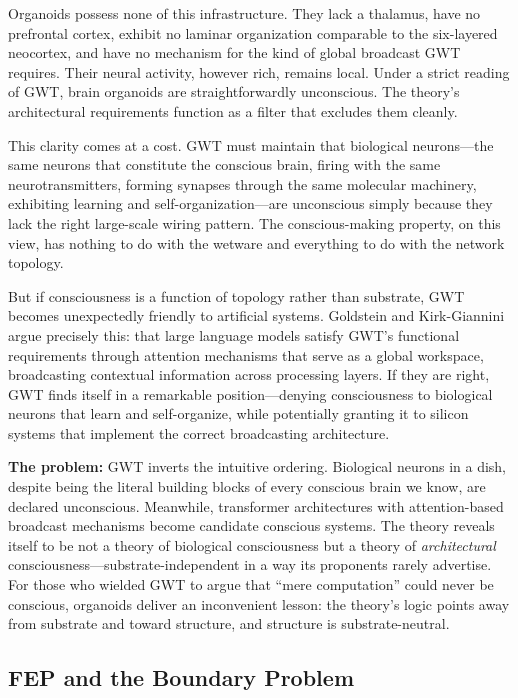 Organoids possess none of this infrastructure. They lack a thalamus, have no prefrontal cortex, exhibit no laminar organization comparable to the six-layered neocortex, and have no mechanism for the kind of global broadcast GWT requires. Their neural activity, however rich, remains local. Under a strict reading of GWT, brain organoids are straightforwardly unconscious. The theory's architectural requirements function as a filter that excludes them cleanly.

This clarity comes at a cost. GWT must maintain that biological neurons---the same neurons that constitute the conscious brain, firing with the same neurotransmitters, forming synapses through the same molecular machinery, exhibiting learning and self-organization---are unconscious simply because they lack the right large-scale wiring pattern. The conscious-making property, on this view, has nothing to do with the wetware and everything to do with the network topology.

But if consciousness is a function of topology rather than substrate, GWT becomes unexpectedly friendly to artificial systems. Goldstein and Kirk-Giannini \cite{goldstein2024case} argue precisely this: that large language models satisfy GWT's functional requirements through attention mechanisms that serve as a global workspace, broadcasting contextual information across processing layers. If they are right, GWT finds itself in a remarkable position---denying consciousness to biological neurons that learn and self-organize, while potentially granting it to silicon systems that implement the correct broadcasting architecture.

\textbf{The problem:} GWT inverts the intuitive ordering. Biological neurons in a dish, despite being the literal building blocks of every conscious brain we know, are declared unconscious. Meanwhile, transformer architectures with attention-based broadcast mechanisms become candidate conscious systems. The theory reveals itself to be not a theory of biological consciousness but a theory of \textit{architectural} consciousness---substrate-independent in a way its proponents rarely advertise. For those who wielded GWT to argue that ``mere computation'' could never be conscious, organoids deliver an inconvenient lesson: the theory's logic points away from substrate and toward structure, and structure is substrate-neutral.

\subsection{FEP and the Boundary Problem}

